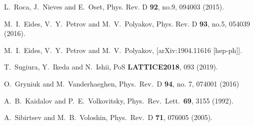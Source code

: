 \documentclass[prd,amsmath,twocolumn,floatfix,amssymb, preprintnumbers, linenumbers,nofootinbib, superscriptaddress]{revtex4}
\begin{document}
\begin{thebibliography}{99}
L.~Roca, J.~Nieves and E.~Oset,
Phys. Rev. D \textbf{92}, no.9, 094003 (2015). 


M.~I.~Eides, V.~Y.~Petrov and M.~V.~Polyakov,
Phys. Rev. D \textbf{93}, no.5, 054039 (2016).


M.~I.~Eides, V.~Y.~Petrov and M.~V.~Polyakov,
[arXiv:1904.11616 [hep-ph]].


T.~Sugiura, Y.~Ikeda and N.~Ishii,
PoS \textbf{LATTICE2018}, 093 (2019). 







  O.~Gryniuk and M.~Vanderhaeghen,
  Phys.\ Rev.\ D {\bf 94}, no. 7, 074001 (2016)

  A.~B.~Kaidalov and P.~E.~Volkovitsky,
  Phys.\ Rev.\ Lett.\  {\bf 69}, 3155 (1992).


  A.~Sibirtsev and M.~B.~Voloshin,
  Phys.\ Rev.\ D {\bf 71}, 076005 (2005).



\end{thebibliography}
\end{document}

